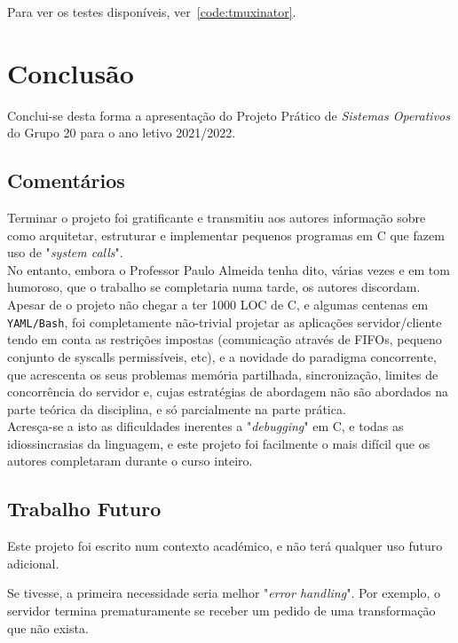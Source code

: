 \documentclass[11pt,a4paper]{report}%
\def\so{\emph{Sistemas Operativos}\xspace}
\begin{document}
Para ver os testes disponíveis, ver~\ref{code:tmuxinator}.

{\let\clearpage\relax \chapter{Conclusão} \label{concl} }

Conclui-se desta forma a apresentação do Projeto Prático de \so do Grupo 20 para o
ano letivo 2021/2022.

\section{Comentários}

Terminar o projeto foi gratificante e transmitiu aos autores informação sobre como
arquitetar, estruturar e implementar pequenos programas em C que fazem uso de "\textit{system calls}".\\

No entanto, embora o Professor Paulo Almeida tenha dito, várias vezes e em tom humoroso, que o
trabalho se completaria numa tarde, os autores discordam.\\

Apesar de o projeto não chegar a ter 1000 LOC de C, e algumas centenas em \texttt{YAML/Bash},
foi completamente não-trivial projetar as aplicações servidor/cliente tendo em conta as restrições
impostas (comunicação através de FIFOs, pequeno conjunto de syscalls permissíveis, etc), e a novidade do
paradigma concorrente, que acrescenta os seus problemas \textemdash memória partilhada, sincronização,
limites de concorrência do servidor \textemdash e, cujas estratégias de abordagem não são abordados na parte
teórica da disciplina, e só parcialmente na parte prática.\\

Acresça-se a isto as dificuldades inerentes a "\textit{debugging}" em C, e todas as idiossincrasias da
linguagem, e este projeto foi facilmente o mais difícil que os autores completaram durante o curso inteiro.

\section{Trabalho Futuro}

Este projeto foi escrito num contexto académico, e não terá qualquer uso futuro adicional.

Se tivesse, a primeira necessidade seria melhor "\textit{error handling}".
Por exemplo, o servidor termina prematuramente se receber um pedido de uma transformação que
não exista.
\end{document}
